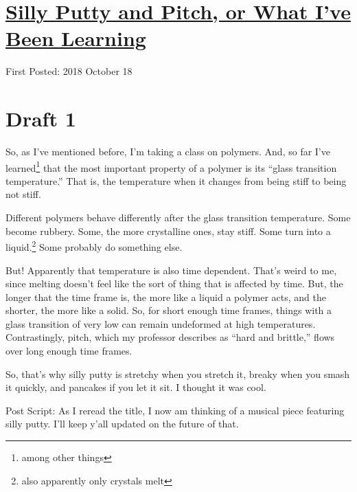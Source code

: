 \documentclass[12pt]{article}[titlepage]
\newcommand{\say}[1]{``#1''}
\newcommand{\1}{\={a}}
\newcommand{\2}{\={e}}
\newcommand{\3}{\={\i}}
\newcommand{\4}{\=o}
\newcommand{\5}{\=u}
\newcommand{\6}{\={A}}
\renewcommand{\,}{\textsuperscript{,}}
\begin{document}
\doublespacing
\section{\href{silly-putty-and-pitch.html}{Silly Putty and Pitch, or What I've Been Learning}}
First Posted: 2018 October 18
\section{Draft 1}
So, as I've mentioned before, I'm taking a class on polymers.
And, so far I've learned\footnote{among other things} that the most important property of a polymer is its \say{glass transition temperature.}
That is, the temperature when it changes from being stiff to being not stiff.

Different polymers behave differently after the glass transition temperature.
Some become rubbery.
Some, the more crystalline ones, stay stiff.
Some turn into a liquid.\footnote{also apparently only crystals melt}
Some probably do something else.

But!
Apparently that temperature is also time dependent.
That's weird to me, since melting doesn't feel like the sort of thing that is affected by time.
But, the longer that the time frame is, the more like a liquid a polymer acts, and the shorter, the more like a solid.
So, for short enough time frames, things with a glass transition of very low can remain undeformed at high temperatures.
Contrastingly, pitch, which my professor describes as \say{hard and brittle,} flows over long enough time frames.

So, that's why silly putty is stretchy when you stretch it, breaky when you smash it quickly, and pancakes if you let it sit.
I thought it was cool.

Post Script: As I reread the title, I now am thinking of a musical piece featuring silly putty.
I'll keep y'all updated on the future of that.
\end{document}
